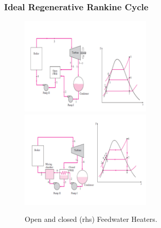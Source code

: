 \documentclass[10pt,compress]{beamer}
\begin{document}
\begin{frame}
 \frametitle{Ideal Regenerative Rankine Cycle}
    \begin{figure}%
     \begin{center}
      \includegraphics[width=6.25cm,clip]{./Pics/Regenerative_Rankine_Cycle_OpenFWH}
      \includegraphics[width=6.25cm,clip]{./Pics/Regenerative_Rankine_Cycle_ClosedFWH}
\caption{Open and closed (rhs) Feedwater Heaters.}
     \end{center}
    \end{figure}  
\end{frame}
\end{document}
